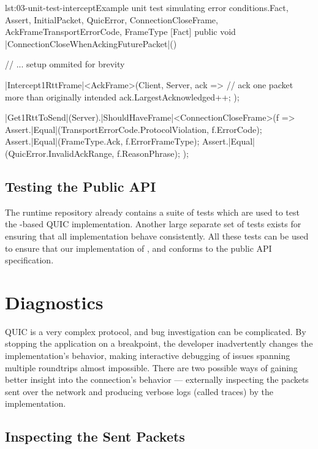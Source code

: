 \begin{myListingCsharp}{lst:03-unit-test-intercept}{Example unit test simulating error conditions.}{Fact, Assert, InitialPacket, QuicError, ConnectionCloseFrame, AckFrame}{TransportErrorCode, FrameType}
    [Fact]
    public void |ConnectionCloseWhenAckingFuturePacket|()
    {
        // ... setup ommited for brevity

        |Intercept1RttFrame|<AckFrame>(Client, Server, ack =>
        {
            // ack one packet more than originally intended
            ack.LargestAcknowledged++;
        });

        |Get1RttToSend|(Server).|ShouldHaveFrame|<ConnectionCloseFrame>(f =>
        {
            Assert.|Equal|(TransportErrorCode.ProtocolViolation, f.ErrorCode);
            Assert.|Equal|(FrameType.Ack, f.ErrorFrameType);
            Assert.|Equal|(QuicError.InvalidAckRange, f.ReasonPhrase);
        });
    }
\end{myListingCsharp}

\subsection{Testing the Public API}

The \dotnet{} runtime repository already contains a suite of tests which are used to test the
\libmsquic{}-based QUIC implementation. Another large separate set of tests exists for ensuring that
all  implementation behave consistently. All these tests can be used to ensure that
our implementation of \QuicListener{}, \QuicConnection{} and \QuicStream{} conforms to the public
API specification.

\section{Diagnostics}

QUIC is a very complex protocol, and bug investigation can be complicated. By stopping the
application on a breakpoint, the developer inadvertently changes the implementation's behavior,
making interactive debugging of issues spanning multiple roundtrips almost impossible. There are two
possible ways of gaining better insight into the connection's behavior --- externally inspecting the
packets sent over the network and producing verbose logs (called traces) by the implementation.

\subsection{Inspecting the Sent Packets}

